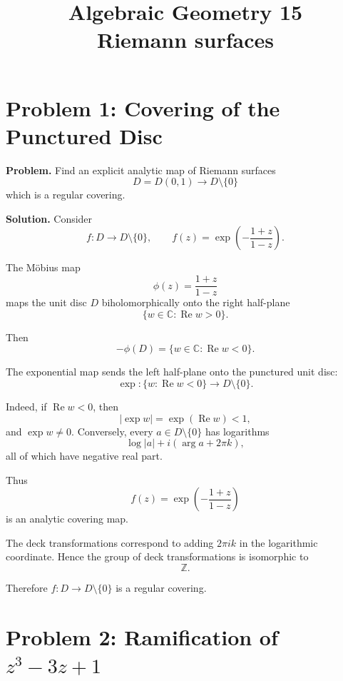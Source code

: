 \documentclass[12pt,a4paper]{article}
\theoremstyle{notespace}
\begin{document}
\title{Algebraic Geometry 15\\
	\large Riemann surfaces}
\author{}
\date{}

	\maketitle
	

	\setcounter{section}{0}

\tableofcontents

	\clearpage
	
	
	\section{Problem 1: Covering of the Punctured Disc}
	
	\textbf{Problem.}
	Find an explicit analytic map of Riemann surfaces
	\[
	D=D(0,1)\longrightarrow D\setminus\{0\}
	\]
	which is a regular covering.
	
	\textbf{Solution.}
	Consider
	\[
	f:D\to D\setminus\{0\},\qquad 
	f(z)=\exp\left(-\frac{1+z}{1-z}\right).
	\]
	
	The Möbius map
	\[
	\phi(z)=\frac{1+z}{1-z}
	\]
	maps the unit disc \(D\) biholomorphically onto the right half-plane
	\[
	\{w\in\mathbb C:\operatorname{Re}w>0\}.
	\]
	
	Then
	\[
	-\phi(D)=\{w\in\mathbb C:\operatorname{Re}w<0\}.
	\]
	
	The exponential map sends the left half-plane onto the punctured unit disc:
	\[
	\exp:\{w:\operatorname{Re}w<0\}\to D\setminus\{0\}.
	\]
	
	Indeed, if \(\operatorname{Re}w<0\), then
	\[
	|\exp w|=\exp(\operatorname{Re}w)<1,
	\]
	and \(\exp w\neq 0\). Conversely, every \(a\in D\setminus\{0\}\) has logarithms
	\[
	\log |a|+i(\arg a+2\pi k),
	\]
	all of which have negative real part.
	
	Thus
	\[
	f(z)=\exp\left(-\frac{1+z}{1-z}\right)
	\]
	is an analytic covering map.
	
	The deck transformations correspond to adding \(2\pi i k\) in the logarithmic coordinate. Hence the group of deck transformations is isomorphic to
	\[
	\mathbb Z.
	\]
	
	Therefore \(f:D\to D\setminus\{0\}\) is a regular covering.

\section{Problem 2: Ramification of \(z^3-3z+1\)}
\end{document}
